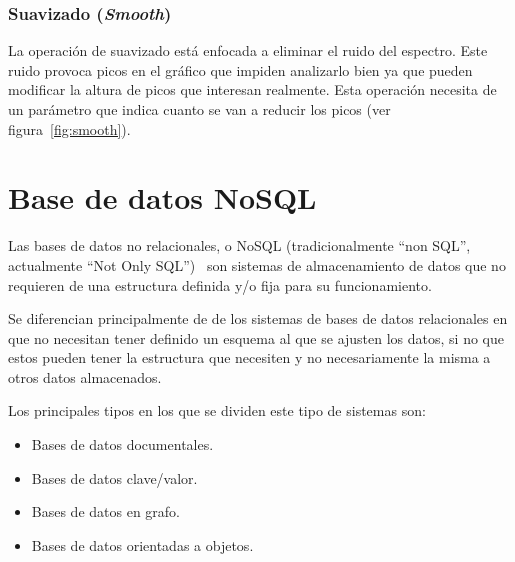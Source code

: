 
\subsubsection{Suavizado (\textit{Smooth})}

La operación de suavizado está enfocada a eliminar el ruido del espectro. Este
ruido provoca picos en el gráfico que impiden analizarlo bien ya que 
pueden modificar la altura de picos que interesan realmente. Esta operación
necesita de un parámetro que indica cuanto se van a reducir los picos (ver
figura~\ref{fig:smooth}).


\section{Base de datos NoSQL}

Las bases de datos no relacionales, o NoSQL (tradicionalmente ``non SQL'',
actualmente ``Not Only SQL'')~\cite{wiki:nosql} son sistemas de almacenamiento 
de datos que no requieren de una estructura definida y/o fija para su 
funcionamiento.

Se diferencian principalmente de de los sistemas de bases de datos relacionales
en que no necesitan tener definido un esquema al que se ajusten los datos, si no
que estos pueden tener la estructura que necesiten y no necesariamente la misma
a otros datos almacenados.

Los principales tipos en los que se dividen este tipo de sistemas son:
\begin{itemize}
	\item Bases de datos documentales.
	\item Bases de datos clave/valor.
	\item Bases de datos en grafo.
	\item Bases de datos orientadas a objetos.
\end{itemize}

